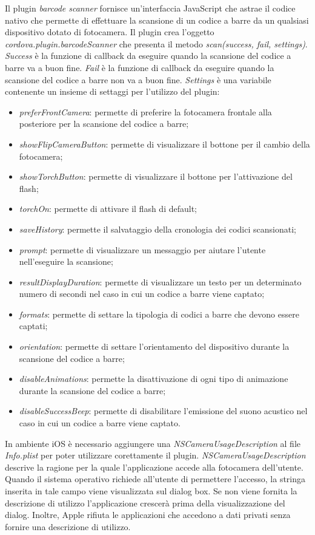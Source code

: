 Il plugin \textit{barcode scanner} fornisce un'interfaccia JavaScript che astrae il codice nativo che permette di effettuare la scansione di un codice a barre da un qualsiasi dispositivo dotato di fotocamera. Il plugin crea l'oggetto \textit{cordova.plugin.barcodeScanner} che presenta il metodo \textit{scan(success, fail, settings)}. \textit{Success} è la funzione di callback da eseguire quando la scansione del codice a barre va a buon fine. \textit{Fail} è la funzione di callback da eseguire quando la scansione del codice a barre non va a buon fine. \textit{Settings} è una variabile contenente un insieme di settaggi per l'utilizzo del plugin:
\begin{itemize}
	\item \textit{preferFrontCamera}: permette di preferire la fotocamera frontale alla posteriore per la scansione del codice a barre;
	\item \textit{showFlipCameraButton}: permette di visualizzare il bottone per il cambio della fotocamera;
	\item \textit{showTorchButton}: permette di visualizzare il bottone per l'attivazione del flash;
	\item \textit{torchOn}: permette di attivare il flash di default;
	\item \textit{saveHistory}: permette il salvataggio della cronologia dei codici scansionati;
	\item \textit{prompt}: permette di visualizzare un messaggio per aiutare l'utente nell'eseguire la scansione;
	\item \textit{resultDisplayDuration}: permette di visualizzare un testo per un determinato numero di secondi nel caso in cui un codice a barre viene captato;
	\item \textit{formats}: permette di settare la tipologia di codici a barre che devono essere captati;
	\item \textit{orientation}: permette di settare l'orientamento del dispositivo durante la scansione del codice a barre;
	\item \textit{disableAnimations}: permette la disattivazione di ogni tipo di animazione durante la scansione del codice a barre;
	\item \textit{disableSuccessBeep}: permette di disabilitare l'emissione del suono acustico nel caso in cui un codice a barre viene captato.
\end{itemize}
In ambiente iOS è necessario aggiungere una \textit{NSCameraUsageDescription} al file \textit{Info.plist} per poter utilizzare corettamente il plugin. \textit{NSCameraUsageDescription} descrive la ragione per la quale l'applicazione accede alla fotocamera dell'utente. Quando il sistema operativo richiede all'utente di permettere l'accesso, la stringa inserita in tale campo viene visualizzata sul dialog box. Se non viene fornita la descrizione di utilizzo l'applicazione crescerà prima della visualizzazione del dialog. Inoltre, Apple rifiuta le applicazioni che accedono a dati privati senza fornire una descrizione di utilizzo. 

